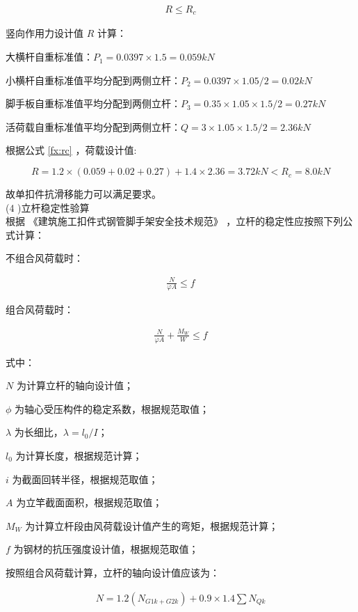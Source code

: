 \begin{align}
    \label{fx:rc}
    R \leq R_c
\end{align}

竖向作用力设计值 $R$ 计算：

 大横杆自重标准值：$P_1=0.0397×1.5=0.059kN$

 小横杆自重标准值平均分配到两侧立杆：$P_2=0.0397×1.05/2=0.02kN$ 

 脚手板自重标准值平均分配到两侧立杆：$P_3=0.35×1.05×1.5/2=0.27kN$ 

 活荷载自重标准值平均分配到两侧立杆：$Q=3×1.05×1.5/2=2.36kN$

根据公式 \ref{fx:rc} ，荷载设计值:

$$R=1.2×(0.059+0.02+0.27)+1.4×2.36=3.72kN<R_c=8.0kN$$

故单扣件抗滑移能力可以满足要求。\\

(4 )立杆稳定性验算\\

根据 《建筑施工扣件式钢管脚手架安全技术规范》 ，立杆的稳定性应按照下列公式计算：

不组合风荷载时：

\begin{align}
    \label{fx:nw}
    \frac{N}{\varphi A}\leq f
\end{align}

组合风荷载时：

\begin{align}
    \label{fx:w}
    \frac{N}{\varphi A}+ \frac{M_W}{W}\leq f
\end{align}

式中：

$N$ 为计算立杆的轴向设计值；

$\phi$ 为轴心受压构件的稳定系数，根据规范取值；

$\lambda$ 为长细比，$\lambda =l_0/I$；

$l_0$ 为计算长度，根据规范计算；

$i$ 为截面回转半径，根据规范取值；

$A$ 为立竿截面面积，根据规范取值；

$M_W$ 为计算立杆段由风荷载设计值产生的弯矩，根据规范计算；

$f$ 为钢材的抗压强度设计值，根据规范取值；

按照组合风荷载计算，立杆的轴向设计值应该为：

\begin{align}
    \label{fx:Nzhou}
    N=1.2(N_{G1k+G2k})+0.9\times 1.4\sum N_{Qk}
\end{align}

